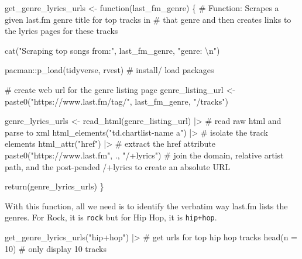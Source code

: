 \documentclass[
  letterpaper,
]{latex/krantz}
\newenvironment{Shaded}{\begin{snugshade}}{\end{snugshade}}
\newcommand{\AttributeTok}[1]{\textcolor[rgb]{0.40,0.45,0.13}{#1}}
\newcommand{\CommentTok}[1]{\textcolor[rgb]{0.37,0.37,0.37}{#1}}
\newcommand{\ControlFlowTok}[1]{\textcolor[rgb]{0.00,0.23,0.31}{#1}}
\newcommand{\DecValTok}[1]{\textcolor[rgb]{0.68,0.00,0.00}{#1}}
\newcommand{\FunctionTok}[1]{\textcolor[rgb]{0.28,0.35,0.67}{#1}}
\newcommand{\NormalTok}[1]{\textcolor[rgb]{0.00,0.23,0.31}{#1}}
\newcommand{\OtherTok}[1]{\textcolor[rgb]{0.00,0.23,0.31}{#1}}
\newcommand{\SpecialCharTok}[1]{\textcolor[rgb]{0.37,0.37,0.37}{#1}}
\newcommand{\StringTok}[1]{\textcolor[rgb]{0.13,0.47,0.30}{#1}}
\begin{document}
\begin{Shaded}
\begin{Highlighting}[]
\NormalTok{get\_genre\_lyrics\_urls }\OtherTok{\textless{}{-}} \ControlFlowTok{function}\NormalTok{(last\_fm\_genre) \{}
  \CommentTok{\# Function: Scrapes a given last.fm genre title for top tracks in}
  \CommentTok{\# that genre and then creates links to the lyrics pages for these tracks}
  
  \FunctionTok{cat}\NormalTok{(}\StringTok{"Scraping top songs from:"}\NormalTok{, last\_fm\_genre, }\StringTok{"genre: }\SpecialCharTok{\textbackslash{}n}\StringTok{"}\NormalTok{)}
  
\NormalTok{  pacman}\SpecialCharTok{::}\FunctionTok{p\_load}\NormalTok{(tidyverse, rvest) }\CommentTok{\# install/ load packages}
  
  \CommentTok{\# create web url for the genre listing page}
\NormalTok{  genre\_listing\_url }\OtherTok{\textless{}{-}} 
    \FunctionTok{paste0}\NormalTok{(}\StringTok{"https://www.last.fm/tag/"}\NormalTok{, last\_fm\_genre, }\StringTok{"/tracks"}\NormalTok{) }
  
\NormalTok{  genre\_lyrics\_urls }\OtherTok{\textless{}{-}} 
    \FunctionTok{read\_html}\NormalTok{(genre\_listing\_url) }\SpecialCharTok{|\textgreater{}} \CommentTok{\# read raw html and parse to xml}
    \FunctionTok{html\_elements}\NormalTok{(}\StringTok{"td.chartlist{-}name a"}\NormalTok{) }\SpecialCharTok{|\textgreater{}} \CommentTok{\# isolate the track elements}
    \FunctionTok{html\_attr}\NormalTok{(}\StringTok{"href"}\NormalTok{) }\SpecialCharTok{|\textgreater{}} \CommentTok{\# extract the href attribute}
    \FunctionTok{paste0}\NormalTok{(}\StringTok{"https://www.last.fm"}\NormalTok{, ., }\StringTok{"/+lyrics"}\NormalTok{) }\CommentTok{\# join the domain, relative artist path, and the post{-}pended /+lyrics to create an absolute URL}
  
  \FunctionTok{return}\NormalTok{(genre\_lyrics\_urls)}
\NormalTok{\}}
\end{Highlighting}
\end{Shaded}

With this function, all we need is to identify the verbatim way last.fm
lists the genres. For Rock, it is \texttt{rock} but for Hip Hop, it is
\texttt{hip+hop}.

\begin{Shaded}
\begin{Highlighting}[]
\FunctionTok{get\_genre\_lyrics\_urls}\NormalTok{(}\StringTok{"hip+hop"}\NormalTok{) }\SpecialCharTok{|\textgreater{}}  \CommentTok{\# get urls for top hip hop tracks}
  \FunctionTok{head}\NormalTok{(}\AttributeTok{n =} \DecValTok{10}\NormalTok{) }\CommentTok{\# only display 10 tracks}
\end{Highlighting}
\end{Shaded}
\end{document}
